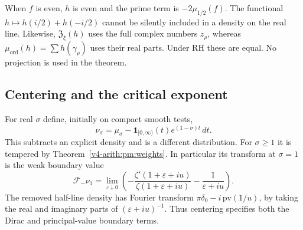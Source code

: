 When $f$ is even, $h$ is even and the prime term is
$-2\mu_{1/2}(f)$. The functional
$h\mapsto h(i/2)+h(-i/2)$ cannot be silently included in a density
on the real line. Likewise, $\mathfrak Z_\xi(h)$ uses the full
complex numbers $z_\rho$, whereas
$\mu_{\mathrm{ord}}(h)=\sum h(\gamma_\rho)$ uses their real parts.
Under RH these are equal. No projection is used in the theorem.

\subsection{Centering and the critical exponent}
\label{v4-arith:pm:centered-section}

For real $\sigma$ define, initially on compact smooth tests,
\[
 \nu_\sigma=\mu_\sigma
       -\mathbf1_{[0,\infty)}(t)e^{(1-\sigma)t}\,dt.
\]
This subtracts an explicit density and is a different distribution.
For $\sigma\geq1$ it is tempered by
Theorem~\ref{v4-arith:pm:weights}. In particular its transform at
$\sigma=1$ is the weak boundary value
\[
 \mathcal F_-\nu_1
 =\lim_{\varepsilon\downarrow0}
    \left(-\frac{\zeta'(1+\varepsilon+iu)}
                 {\zeta(1+\varepsilon+iu)}
                    -\frac1{\varepsilon+iu}\right).
\]
The removed half-line density has Fourier transform
$\pi\delta_0-i\,\mathrm{pv}(1/u)$, by taking the real and imaginary
parts of $(\varepsilon+iu)^{-1}$. Thus centering specifies both the
Dirac and principal-value boundary terms.

